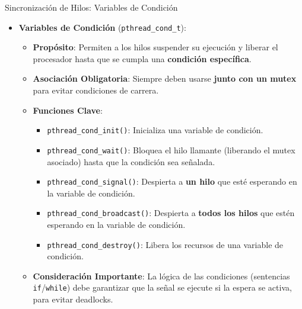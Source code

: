 \documentclass{beamer}
\begin{document}
\begin{frame}{Sincronización de Hilos: Variables de Condición}
    \begin{itemize}
        \item \textbf{Variables de Condición} (\texttt{pthread\_cond\_t}):
        \begin{itemize}
            \item \textbf{Propósito}: Permiten a los hilos suspender su ejecución y liberar el procesador hasta que se cumpla una \textbf{condición específica}.
            \item \textbf{Asociación Obligatoria}: Siempre deben usarse \textbf{junto con un mutex} para evitar condiciones de carrera.
            \item \textbf{Funciones Clave}:
                \begin{itemize}
                    \item \texttt{pthread\_cond\_init()}: Inicializa una variable de condición.
                    \item \texttt{pthread\_cond\_wait()}: Bloquea el hilo llamante (liberando el mutex asociado) hasta que la condición sea señalada.
                    \item \texttt{pthread\_cond\_signal()}: Despierta a \textbf{un hilo} que esté esperando en la variable de condición.
                    \item \texttt{pthread\_cond\_broadcast()}: Despierta a \textbf{todos los hilos} que estén esperando en la variable de condición.
                    \item \texttt{pthread\_cond\_destroy()}: Libera los recursos de una variable de condición.
                \end{itemize}
            \item \textbf{Consideración Importante}: La lógica de las condiciones (sentencias \texttt{if}/\texttt{while}) debe garantizar que la señal se ejecute si la espera se activa, para evitar deadlocks.
        \end{itemize}
    \end{itemize}
\end{frame}
\end{document}
